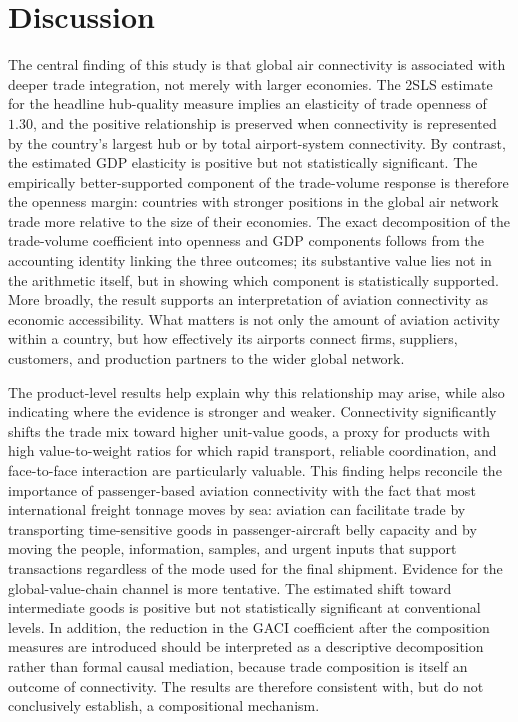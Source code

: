 \section{Discussion}
\label{sec:discussion}
The central finding of this study is that global air connectivity is
associated with deeper trade integration, not merely with larger economies.
The 2SLS estimate for the headline hub-quality measure implies an elasticity
of trade openness of $1.30$, and the positive relationship is preserved when
connectivity is represented by the country's largest hub or by total
airport-system connectivity. By contrast, the estimated GDP elasticity is
positive but not statistically significant. The empirically better-supported
component of the trade-volume response is therefore the openness margin:
countries with stronger positions in the global air network trade more
relative to the size of their economies. The exact decomposition of the
trade-volume coefficient into openness and GDP components follows from the
accounting identity linking the three outcomes; its substantive value lies
not in the arithmetic itself, but in showing which component is statistically
supported. More broadly, the result supports an interpretation of aviation
connectivity as economic accessibility. What matters is not only the amount
of aviation activity within a country, but how effectively its airports
connect firms, suppliers, customers, and production partners to the wider
global network.

The product-level results help explain why this relationship may arise, while
also indicating where the evidence is stronger and weaker. Connectivity
significantly shifts the trade mix toward higher unit-value goods, a proxy
for products with high value-to-weight ratios for which rapid transport,
reliable coordination, and face-to-face interaction are particularly
valuable. This finding helps reconcile the importance of passenger-based
aviation connectivity with the fact that most international freight tonnage
moves by sea: aviation can facilitate trade by transporting time-sensitive
goods in passenger-aircraft belly capacity and by moving the people,
information, samples, and urgent inputs that support transactions regardless
of the mode used for the final shipment. Evidence for the global-value-chain
channel is more tentative. The estimated shift toward intermediate goods is
positive but not statistically significant at conventional levels. In
addition, the reduction in the GACI coefficient after the composition
measures are introduced should be interpreted as a descriptive decomposition
rather than formal causal mediation, because trade composition is itself an
outcome of connectivity. The results are therefore consistent with, but do
not conclusively establish, a compositional mechanism.

